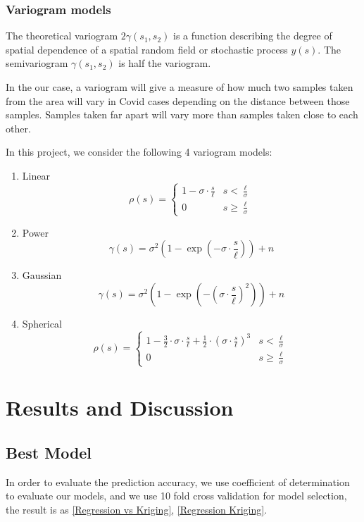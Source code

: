 \documentclass{article}
\begin{document}
\subsubsection{Variogram models}
The theoretical variogram $2 \gamma\left( s _{1}, s _{2}\right)$ is a function describing the degree of spatial dependence of a spatial random field or stochastic process $y( s )$. The semivariogram $\gamma\left( s _{1}, s _{2}\right)$ is half the variogram.

In the our case, a variogram will give a measure of how much two samples taken from the area will vary in Covid cases depending on the distance between those samples. Samples taken far apart will vary more than samples taken close to each other.

In this project, we consider the following 4 variogram models:
\begin{enumerate}
    \item Linear $$
        \rho(s)= \begin{cases}1-\sigma \cdot \frac{s}{\ell} & s<\frac{\ell}{\sigma} \\ 0 & s \geq \frac{\ell}{\sigma}\end{cases}
        $$
    \item Power $$
        \gamma(s)=\sigma^{2}\left(1-\exp \left(-\sigma \cdot \frac{s}{\ell}\right)\right)+n
        $$
    \item Gaussian $$\gamma(s)=\sigma^{2}\left(1-\exp \left(-\left(\sigma \cdot \frac{s}{\ell}\right)^{2}\right)\right)+n$$
    \item Spherical $$\rho(s)= \begin{cases}1-\frac{3}{2} \cdot \sigma \cdot \frac{s}{\ell}+\frac{1}{2} \cdot\left(\sigma \cdot \frac{s}{\ell}\right)^{3} & s<\frac{\ell}{\sigma} \\ 0 & s \geq \frac{\ell}{\sigma}\end{cases}$$
\end{enumerate}




\section{Results and Discussion}
\subsection{Best Model}
In order to evaluate the prediction accuracy, we use coefficient of determination to evaluate our models, and we use 10 fold cross validation for model selection, the result is as \cref{Regression vs Kriging}, \cref{Regression Kriging}. 
\end{document}
